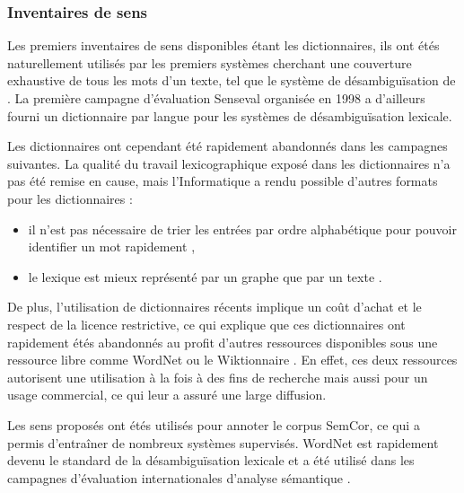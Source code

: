 \subsubsection{Inventaires de sens}

Les premiers inventaires de sens disponibles étant les dictionnaires, ils ont
étés naturellement utilisés par les premiers systèmes cherchant une couverture
exhaustive de tous les mots d'un texte, tel que le système de désambiguïsation
de \cite{lesk1986automatic}. La première campagne d'évaluation Senseval
organisée en 1998 \citep{kilgarriff2000introduction} a d'ailleurs fourni un
dictionnaire par langue pour les systèmes de désambiguïsation lexicale.

Les dictionnaires ont cependant été rapidement abandonnés dans les campagnes
suivantes. La qualité du travail lexicographique exposé dans les dictionnaires
n'a pas été remise en cause, mais l'Informatique a rendu possible d'autres
formats pour les dictionnaires :

\begin{itemize}
    \item il n'est pas nécessaire de trier les entrées par ordre alphabétique
        pour pouvoir identifier un mot rapidement \citep{miller1985wordnet},
    \item le lexique est mieux représenté par un graphe que par un texte
        \citep{polguere2013tissage}.
\end{itemize}

De plus, l'utilisation de dictionnaires récents implique un coût d'achat et le
respect de la licence restrictive, ce qui explique que ces dictionnaires ont
rapidement étés abandonnés au profit d'autres ressources disponibles sous une
ressource libre comme WordNet \citep{edmonds2002introduction} ou le
Wiktionnaire \citep{mouton2010jaws,nguyen2012using}. En effet, ces deux
ressources autorisent une utilisation à la fois à des fins de recherche mais
aussi pour un usage commercial, ce qui leur a assuré une large diffusion.



Les sens proposés ont étés utilisés pour annoter le corpus SemCor, ce qui a
permis d'entraîner de nombreux systèmes supervisés. WordNet est rapidement
devenu le standard de la désambiguïsation lexicale et a été utilisé dans les
campagnes d'évaluation internationales d'analyse sémantique
\citep{navigli2009word}.

